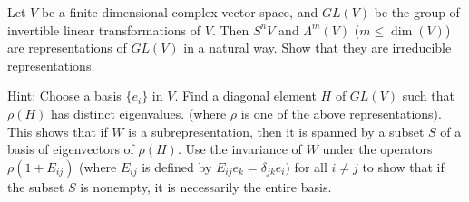 \documentclass[twoside]{article}
\begin{document}
\newpage
\begin{ejercicio}{3.19}
Let $V$ be a finite dimensional complex vector space, and $GL(V)$ be the group of invertible linear transformations of $V$. Then $S^nV$ and $\Lambda^m(V)$ ($m ≤ \dim(V )$) are representations of $GL(V )$ in a natural way. Show that they are irreducible representations.

Hint: Choose a basis $\{e_i\}$ in $V$. Find a diagonal element $H$ of $GL(V)$ such that $ρ(H)$ has
distinct eigenvalues. (where $ρ$ is one of the above representations). This shows that if $W$ is a
subrepresentation, then it is spanned by a subset $S$ of a basis of eigenvectors of $ρ(H)$. Use the
invariance of $W$ under the operators $ρ(1+E_{ij})$ (where $E_{ij}$ is defined by $E_{ij}e_k = δ_{jk}e_i)$ for all $i \neq j$
to show that if the subset $S$ is nonempty, it is necessarily the entire basis.
\end{ejercicio}
\end{document}
